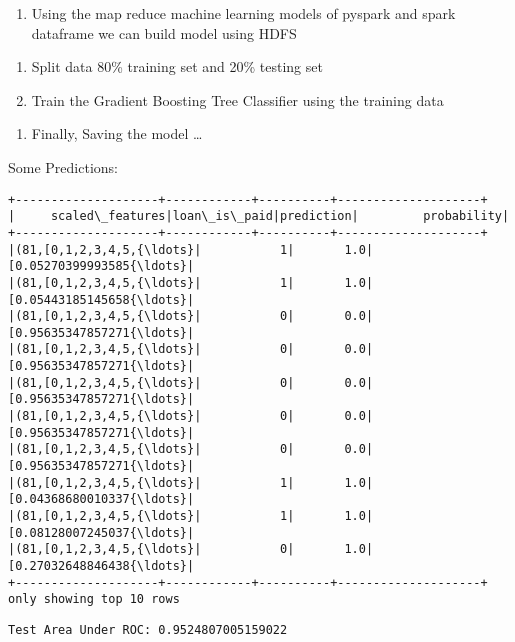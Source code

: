 \documentclass[11pt]{article}
\providecommand{\tightlist}{%
      \setlength{\itemsep}{0pt}\setlength{\parskip}{0pt}}
\begin{document}
    \begin{enumerate}
\def\labelenumi{\arabic{enumi}.}
\tightlist
\item
  Using the map reduce machine learning models of pyspark and spark
  dataframe we can build model using HDFS
\end{enumerate}

    \begin{enumerate}
\def\labelenumi{\arabic{enumi}.}
\setcounter{enumi}{1}
\tightlist
\item
  Split data 80\% training set and 20\% testing set
\item
  Train the Gradient Boosting Tree Classifier using the training data
\end{enumerate}

    \begin{enumerate}
\def\labelenumi{\arabic{enumi}.}
\setcounter{enumi}{3}
\tightlist
\item
  Finally, Saving the model \ldots{}
\end{enumerate}

    Some Predictions:

    \begin{Verbatim}[commandchars=\\\{\}]
+--------------------+------------+----------+--------------------+
|     scaled\_features|loan\_is\_paid|prediction|         probability|
+--------------------+------------+----------+--------------------+
|(81,[0,1,2,3,4,5,{\ldots}|           1|       1.0|[0.05270399993585{\ldots}|
|(81,[0,1,2,3,4,5,{\ldots}|           1|       1.0|[0.05443185145658{\ldots}|
|(81,[0,1,2,3,4,5,{\ldots}|           0|       0.0|[0.95635347857271{\ldots}|
|(81,[0,1,2,3,4,5,{\ldots}|           0|       0.0|[0.95635347857271{\ldots}|
|(81,[0,1,2,3,4,5,{\ldots}|           0|       0.0|[0.95635347857271{\ldots}|
|(81,[0,1,2,3,4,5,{\ldots}|           0|       0.0|[0.95635347857271{\ldots}|
|(81,[0,1,2,3,4,5,{\ldots}|           0|       0.0|[0.95635347857271{\ldots}|
|(81,[0,1,2,3,4,5,{\ldots}|           1|       1.0|[0.04368680010337{\ldots}|
|(81,[0,1,2,3,4,5,{\ldots}|           1|       1.0|[0.08128007245037{\ldots}|
|(81,[0,1,2,3,4,5,{\ldots}|           0|       1.0|[0.27032648846438{\ldots}|
+--------------------+------------+----------+--------------------+
only showing top 10 rows

    \end{Verbatim}

    \begin{Verbatim}[commandchars=\\\{\}]
Test Area Under ROC: 0.9524807005159022
    \end{Verbatim}
\end{document}
